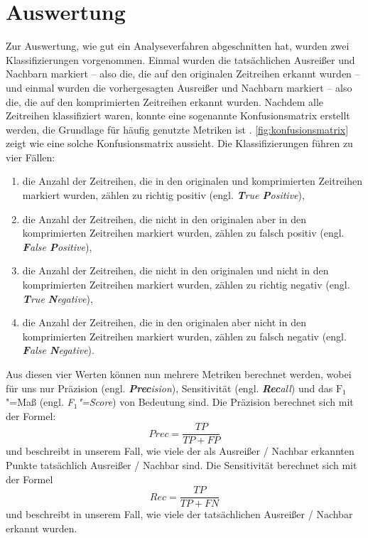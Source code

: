 \section{Auswertung}\label{sec:auswertung}
\newcommand{\tikztextupc}[3]{\node at (#1, #2) [rotate = 90] {\vphantom{/}\smash{#3}};}
Zur Auswertung, wie gut ein Analyseverfahren abgeschnitten hat, wurden zwei Klassifizierungen vorgenommen. Einmal wurden die tatsächlichen Ausreißer und Nachbarn markiert -- also die, die auf den originalen Zeitreihen erkannt wurden -- und einmal wurden die vorhergesagten Ausreißer und Nachbarn markiert -- also die, die auf den komprimierten Zeitreihen erkannt wurden. Nachdem alle Zeitreihen klassifiziert waren, konnte eine sogenannte Konfusionsmatrix erstellt werden, die Grundlage für häufig genutzte Metriken ist \cite{konfusionsmatrix}. \autoref{fig:konfusionsmatrix} zeigt wie eine solche Konfusionsmatrix aussieht. Die Klassifizierungen führen zu vier Fällen: \begin{enumerate}
    \item die Anzahl der Zeitreihen, die in den originalen und komprimierten Zeitreihen markiert wurden, zählen zu richtig positiv (engl. \textit{\textbf{T}rue \textbf{P}ositive}),
    \item die Anzahl der Zeitreihen, die nicht in den originalen aber in den komprimierten Zeitreihen markiert wurden, zählen zu falsch positiv (engl. \textit{\textbf{F}alse \textbf{P}ositive}),
    \item die Anzahl der Zeitreihen, die nicht in den originalen und nicht in den komprimierten Zeitreihen markiert wurden, zählen zu richtig negativ (engl. \textit{\textbf{T}rue \textbf{N}egative}),
    \item die Anzahl der Zeitreihen, die in den originalen aber nicht in den komprimierten Zeitreihen markiert wurden, zählen zu falsch negativ (engl. \textit{\textbf{F}alse \textbf{N}egative}).
\end{enumerate} 

Aus diesen vier Werten können nun mehrere Metriken berechnet werden, wobei für uns nur Präzision (engl. \textit{\textbf{Prec}ision}), Sensitivität (engl. \textit{\textbf{Rec}all}) und das $\text{F}_1$"=Maß (engl. \textit{F$_1$"=Score}) von Bedeutung sind. Die Präzision berechnet sich mit der Formel: \[Prec = \frac{TP}{TP + FP}\]
und beschreibt in unserem Fall, wie viele der als Ausreißer / Nachbar erkannten Punkte tatsächlich Ausreißer / Nachbar sind. Die Sensitivität berechnet sich mit der Formel \[Rec = \frac{TP}{TP + FN}\] und beschreibt in unserem Fall, wie viele der tatsächlichen Ausreißer / Nachbar erkannt wurden.

